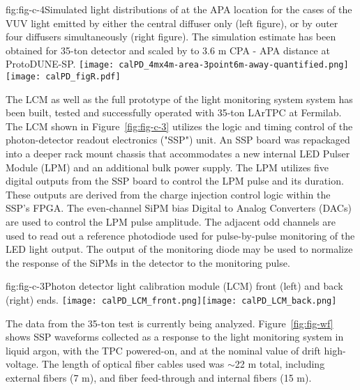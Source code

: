 %
\begin{cdrfigure}{fig:fig-c-4}{Simulated light distributions of at the APA location for the cases of the VUV light emitted by either the central diffuser only (left figure), or by outer four diffusers simultaneously (right figure).
The simulation estimate has been obtained for 35-ton detector and scaled by to 3.6 m CPA - APA distance at ProtoDUNE-SP.}
\texttt{[image: calPD\_4mx4m-area-3point6m-away-quantified.png]}
\texttt{[image: calPD\_figR.pdf]}
\end{cdrfigure}
%

The LCM as well as the full prototype of the light monitoring system system has been built, tested and successfully operated with 35-ton LArTPC at Fermilab. The LCM shown in Figure~\ref{fig:fig-c-3}
utilizes the logic and timing control of the photon-detector readout electronics ("SSP") unit.  
An SSP board was repackaged into a deeper rack mount chassis that accommodates a new internal 
LED Pulser Module (LPM) and an additional bulk power supply. The LPM utilizes five digital outputs from the SSP board to control the LPM pulse and its duration.  
These outputs are derived from the charge injection control logic within the SSP's FPGA.  
The even-channel SiPM bias Digital to Analog Converters (DACs)
are used to control the LPM pulse amplitude.  
The adjacent odd channels are used to read out a reference photodiode used for pulse-by-pulse monitoring of the LED light output.  
The output of the monitoring diode may be used to normalize 
the response of the SiPMs in the detector to the monitoring pulse.

%
 \begin{cdrfigure}[]{fig:fig-c-3}{Photon detector light calibration module (LCM) front (left) and back (right) ends.}
\texttt{[image: calPD\_LCM\_front.png]}\texttt{[image: calPD\_LCM\_back.png]}
\end{cdrfigure}


The data from the 35-ton test is currently being analyzed. %
Figure~\ref{fig:fig-wf} shows SSP waveforms collected as a response to the light  monitoring system %
in liquid argon, with the TPC powered-on, and at the nominal value of drift high-voltage.  
The length of optical fiber cables used %
was $\sim$22 m total, including external fibers (7 m), and fiber feed-through and internal fibers (15 m).

